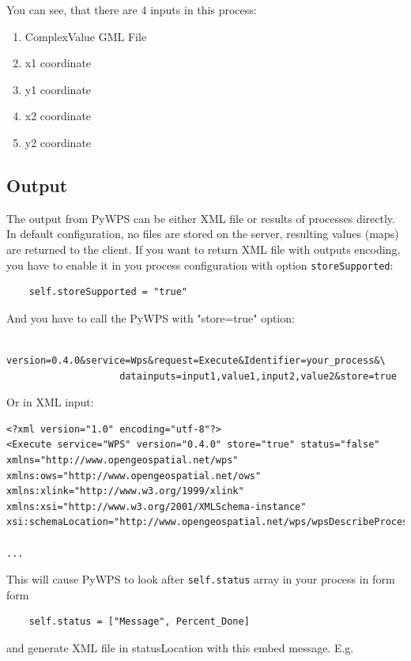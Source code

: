 \documentclass[a4paper,11pt]{article}
\begin{document}
    You can see, that there are 4 inputs in this process: 
     
    \begin{enumerate}
            \item ComplexValue GML File 
            \item x1 coordinate 
            \item y1 coordinate 
            \item x2 coordinate 
            \item y2 coordinate 
    \end{enumerate}
    \subsection{Output}
     
    The output from PyWPS can be either XML file or results of processes directly. In default configuration, no files are stored on the server, resulting values (maps) are 
    returned to the client. If you want to return XML file with outputs
    encoding, you have to enable it in you process configuration with
    option \texttt{storeSupported}:
     
    \begin{verbatim}
    self.storeSupported = "true"
    \end{verbatim}
     
    And you have to call the PyWPS with "store=true" option:
     
    \begin{verbatim}
    version=0.4.0&service=Wps&request=Execute&Identifier=your_process&\
                    datainputs=input1,value1,input2,value2&store=true
    \end{verbatim}
     
    Or in XML input:
     
    \begin{verbatim}
<?xml version="1.0" encoding="utf-8"?>
<Execute service="WPS" version="0.4.0" store="true" status="false"
xmlns="http://www.opengeospatial.net/wps"
xmlns:ows="http://www.opengeospatial.net/ows"
xmlns:xlink="http://www.w3.org/1999/xlink"
xmlns:xsi="http://www.w3.org/2001/XMLSchema-instance"
xsi:schemaLocation="http://www.opengeospatial.net/wps/wpsDescribeProcess.xsd">

...
\end{verbatim}

This will cause PyWPS to look after \texttt{self.status} array in your process in form form 
\begin{verbatim}
    self.status = ["Message", Percent_Done]
\end{verbatim}
and generate XML file in statusLocation with this embed message. E.g.
\end{document}
